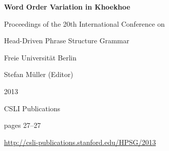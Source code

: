\documentclass[a4paper,11pt]{article}
\begin{document}
\begin{center}
  {\huge\bf Word Order Variation in Khoekhoe\par}

  \bigskip

  {\LARGE  \par}

  \vspace*{3\bigskipamount}

  Proceedings of the 20th International Conference on\par Head-Driven Phrase Structure Grammar

  \bigskip

  Freie Universit\"{a}t Berlin

  \medskip

  Stefan Müller (Editor)

  \medskip

  2013

  \medskip

  CSLI Publications

  \medskip

  pages 27--27

  \medskip

  \url{http://csli-publications.stanford.edu/HPSG/2013}
\end{center}

\newpage

        
\end{document}
